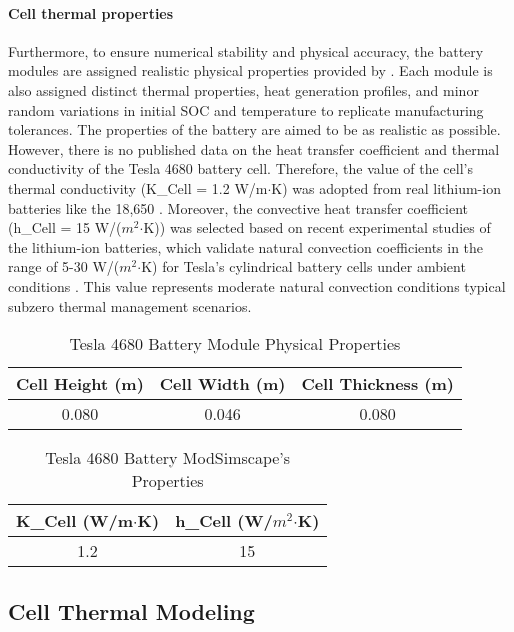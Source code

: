 \documentclass[conference]{IEEEtran}
\begin{document}
\paragraph{\textbf{Cell thermal properties}}

Furthermore, to ensure numerical stability and physical accuracy, the battery modules are assigned realistic physical properties provided by \cite{nigel2022tesla}. Each module is also assigned distinct thermal properties, heat generation profiles, and minor random variations in initial SOC and temperature to replicate manufacturing tolerances. The properties of the battery are aimed to be as realistic as possible. However, there is no published data on the heat transfer coefficient and thermal conductivity of the Tesla 4680 battery cell. Therefore, the value of the cell's thermal conductivity (K\_Cell = 1.2 W/m$\cdot$K) was adopted from real lithium-ion batteries like the 18,650 \cite{JIANG2023108516}. Moreover, the convective heat transfer coefficient (h\_Cell = 15 W/($m^2$$\cdot$K)) was selected based on recent experimental studies of the lithium-ion batteries, which validate natural convection coefficients in the range of 5-30 W/($m^2$$\cdot$K) for Tesla's cylindrical battery cells under ambient conditions \cite{guan2022internal}. This value represents moderate natural convection conditions typical subzero thermal management scenarios.

\begin{table}[H]
\centering
\caption{Tesla 4680 Battery Module Physical Properties}
\begin{tabular}{|c|c|c|}
\hline
\textbf{Cell Height (m)} & \textbf{Cell Width (m)} & \textbf{Cell Thickness (m)}\\
\hline
0.080 & 0.046 & 0.080\\
\hline
\end{tabular}
\end{table}

\begin{table}[H]
\centering
\caption{Tesla 4680 Battery ModSimscape's Properties}
\begin{tabular}{|c|c|}
\hline
\textbf{K\_Cell (W/m$\cdot$K)} & \textbf{h\_Cell (W/$m^2$$\cdot$K)}\\
\hline
1.2 & 15\\
\hline
\end{tabular}
\end{table}

\subsection{\textbf{Cell Thermal Modeling}}
\end{document}
